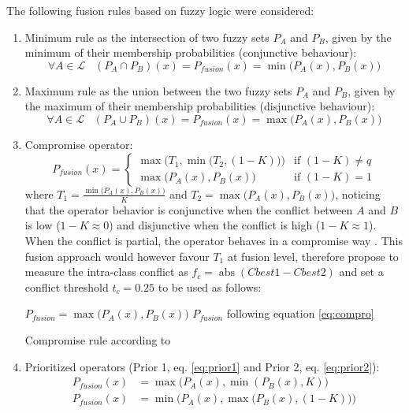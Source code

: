\documentclass[10pt]{article}
\DeclareMathOperator{\abs}{abs}
\begin{document}
The following fusion rules based on fuzzy logic were considered:
\begin{enumerate}
    \item Minimum rule as the intersection of two fuzzy sets $P_A$ and $P_B$, given by the minimum of their membership probabilities (conjunctive behaviour):
    \begin{equation}
        \forall A\in\mathcal{L} \;\;\; (P_A\cap P_B)(x) = P_{fusion}(x) =\min\big(P_A(x),P_B(x)\big)
    \end{equation}
    \item Maximum rule as the union between the two fuzzy sets $P_A$ and $P_B$, given by the maximum of their membership probabilities (disjunctive behaviour):
    \begin{equation}
        \forall A\in\mathcal{L} \;\;\; (P_A\cup P_B)(x) = P_{fusion}(x)=\max\big(P_A(x),P_B(x)\big)
    \end{equation}
    \item Compromise operator:
    \begin{equation}\label{eq:compro}
        P_{fusion}(x)=
        \begin{cases}
            \max\Big(T_1,\min\big(T_2,(1-K)\big)\Big)& \text{if } (1-K)\neq q\\
            \max\Big(P_A(x),P_B(x)\Big) &\text{if }(1-K)= 1
        \end{cases}
    \end{equation}
    where $T_1=\frac{\min\big(P_A(x),P_B(x)\big)}{K}$ and $T_2=\max\big(P_A(x),P_B(x)\big)$, noticing that the operator behavior is conjunctive when the conflict between $A$ and $B$ is low ($1-K\approx 0$) and disjunctive when the conflict is high ($1-K\approx 1$). When the conflict is partial, the operator behaves in a compromise way \parencite{ouerghemmi_two-step_2017}. This fusion approach would however favour $T_1$ at fusion level, therefore \cite{ouerghemmi_two-step_2017} propose to measure the intra-class conflict as $f_c=\abs(Cbest1-Cbest2)$ and set a conflict threshold $t_c=0.25$ to be used as follows:
    
    \begin{algorithm}[H]
        \begin{algorithmic}
            \State $P_{fusion}=\max\big(P_A(x),P_B(x)\big)$
            \Else
            \State $P_{fusion}$ following equation \ref{eq:compro}
            \EndIf
        \end{algorithmic}
        \caption{Compromise rule according to \cite{ouerghemmi_two-step_2017}}
        \label{alg:comp-wo}
    \end{algorithm}
    \item Prioritized operators (Prior 1, eq. \ref{eq:prior1} and Prior 2, eq. \ref{eq:prior2}):
    \begin{align}
        P_{fusion}(x)&=\max\big(P_A(x),\min(P_B(x),K)\big)\label{eq:prior1}\\
        P_{fusion}(x)&=\min\Big(P_A(x),\max\big(P_B(x),(1-K)\big)\Big)\label{eq:prior2}
    \end{align}
\end{enumerate}
\end{document}
